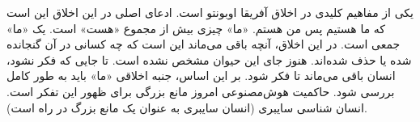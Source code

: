 یکی از مفاهیم کلیدی در اخلاق آفریقا اوبونتو است.
ادعای اصلی در این اخلاق این است که ما هستیم پس من هستم.
«ما» چیزی بیش از مجموع «هست» است.
یک «ما» جمعی است.
در این اخلاق، آنچه باقی می‌ماند این است که چه کسانی در آن گنجانده شده یا حذف شده‌اند.
هنوز جای این حیوان مشخص نشده است.
تا جایی که فکر نشود، انسان باقی می‌ماند تا فکر شود.
بر این اساس، جنبه اخلاقی «ما» باید به طور کامل بررسی شود.
حاکمیت هوش‌مصنوعی امروز مانع بزرگی برای ظهور این تفکر است.
انسان شناسی سایبری (انسان سایبری به عنوان یک مانع بزرگ در راه است).



